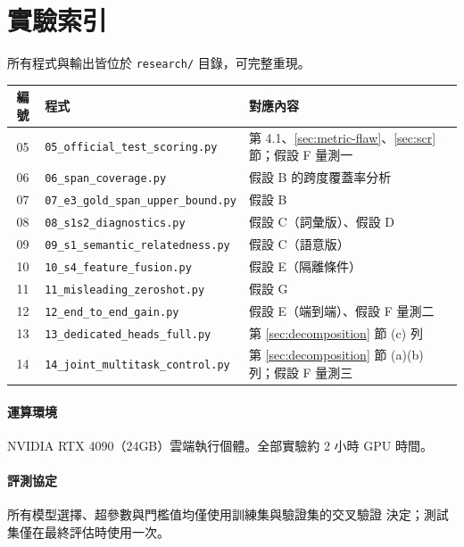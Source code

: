 \documentclass[11pt,a4paper]{ctexart}
\begin{document}
\section{實驗索引}

所有程式與輸出皆位於 \texttt{research/} 目錄，可完整重現。

\begin{table}[h]
\centering
\small
\begin{tabular}{@{}clp{7.5cm}@{}}
\toprule
編號 & 程式 & 對應內容 \\
\midrule
05 & \texttt{05\_official\_test\_scoring.py}      & 第 4.1、\ref{sec:metric-flaw}、\ref{sec:scr} 節；假設 F 量測一 \\
06 & \texttt{06\_span\_coverage.py}               & 假設 B 的跨度覆蓋率分析 \\
07 & \texttt{07\_e3\_gold\_span\_upper\_bound.py} & 假設 B \\
08 & \texttt{08\_s1s2\_diagnostics.py}            & 假設 C（詞彙版）、假設 D \\
09 & \texttt{09\_s1\_semantic\_relatedness.py}    & 假設 C（語意版） \\
10 & \texttt{10\_s4\_feature\_fusion.py}          & 假設 E（隔離條件） \\
11 & \texttt{11\_misleading\_zeroshot.py}         & 假設 G \\
12 & \texttt{12\_end\_to\_end\_gain.py}           & 假設 E（端到端）、假設 F 量測二 \\
13 & \texttt{13\_dedicated\_heads\_full.py}       & 第 \ref{sec:decomposition} 節 (c) 列 \\
14 & \texttt{14\_joint\_multitask\_control.py}    & 第 \ref{sec:decomposition} 節 (a)(b) 列；假設 F 量測三 \\
\bottomrule
\end{tabular}
\end{table}

\paragraph{運算環境} NVIDIA RTX 4090（24GB）雲端執行個體。全部實驗約 2 小時 GPU 時間。

\paragraph{評測協定} 所有模型選擇、超參數與門檻值均僅使用訓練集與驗證集的交叉驗證
決定；測試集僅在最終評估時使用一次。
\end{document}
